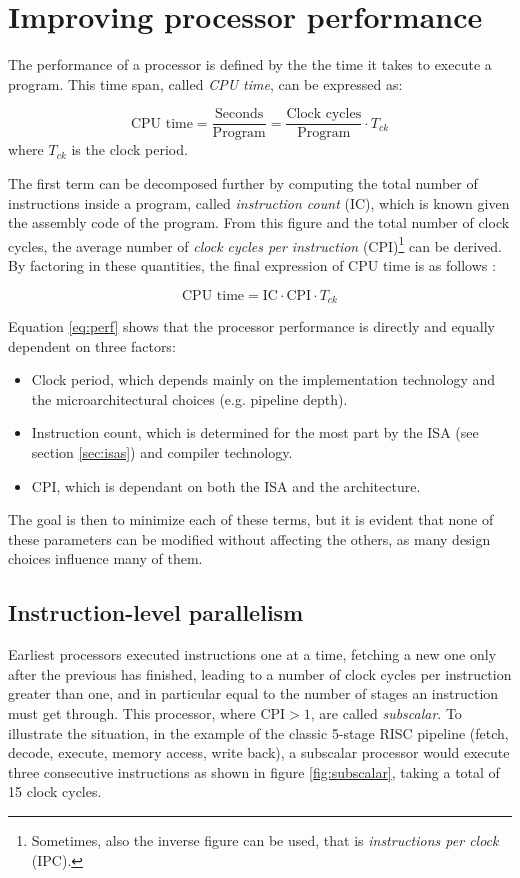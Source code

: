 \chapter{Improving processor performance}
The performance of a processor is defined by the the time it takes to execute a program. This time span, called \emph{CPU time}, can be expressed as:

\begin{equation*}
  \text{CPU time} = \frac{\text{Seconds}}{\text{Program}} = \frac{\text{Clock cycles}}{\text{Program}} \cdot T_{ck}
\end{equation*}
where $T_{ck}$ is the clock period.

The first term can be decomposed further by computing the total number of instructions inside a program, called \emph{instruction count} (IC), which is known given the assembly code of the program. From this figure and the total number of clock cycles, the average number of \emph{clock cycles per instruction} (CPI)\footnote{Sometimes, also the inverse figure can be used, that is \emph{instructions per clock} (IPC).} can be derived. By factoring in these quantities, the final expression of CPU time is as follows \cite[p.~53]{hennessy17}:

\begin{equation}\label{eq:perf}
  \text{CPU time} = \text{IC} \cdot \text{CPI} \cdot T_{ck} 
\end{equation}

Equation \eqref{eq:perf} shows that the processor performance is directly and equally dependent on three factors:
\begin{itemize}
  \item Clock period, which depends mainly on the implementation technology and the microarchitectural choices (e.g. pipeline depth).
  \item Instruction count, which is determined for the most part by the ISA (see section \ref{sec:isas}) and compiler technology.
  \item CPI, which is dependant on both the ISA and the architecture.
\end{itemize}
The goal is then to minimize each of these terms, but it is evident that none of these parameters can be modified without affecting the others, as many design choices influence many of them.

\section{Instruction-level parallelism}
Earliest processors executed instructions one at a time, fetching a new one only after the previous has finished, leading to a number of clock cycles per instruction greater than one, and in particular equal to the number of stages an instruction must get through. This processor, where $\text{CPI} > 1$, are called \emph{subscalar}. To illustrate the situation, in the example of the classic 5-stage RISC pipeline (fetch, decode, execute, memory access, write back), a subscalar processor would execute three consecutive instructions as shown in figure \ref{fig:subscalar}, taking a total of 15 clock cycles.

